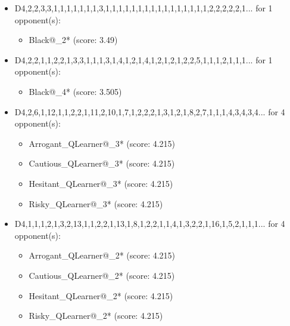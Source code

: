 \begin{appendices}
\begin{itemize}
    \item D4,2,2,3,3,1,1,1,1,1,1,1,3,1,1,1,1,1,1,1,1,1,1,1,1,1,1,1,1,2,2,2,2,2,1... for 1 opponent(s):
    \begin{multicols}{3}
         \begin{itemize}
            \item Black@\_2* (score: 3.49)
        \end{itemize}
     \end{multicols}
     
    \item D4,2,2,1,1,2,2,1,3,3,1,1,1,3,1,4,1,2,1,4,1,2,1,2,1,2,2,5,1,1,1,2,1,1,1... for 1 opponent(s):
    \begin{multicols}{3}
         \begin{itemize}
            \item Black@\_4* (score: 3.505)
        \end{itemize}
     \end{multicols}
     
    \item D4,2,6,1,12,1,1,2,2,1,11,2,10,1,7,1,2,2,2,1,3,1,2,1,8,2,7,1,1,1,4,3,4,3,4... for 4 opponent(s):
    \begin{multicols}{3}
         \begin{itemize}
            \item Arrogant\_QLearner@\_3* (score: 4.215)
            \item Cautious\_QLearner@\_3* (score: 4.215)
            \item Hesitant\_QLearner@\_3* (score: 4.215)
            \item Risky\_QLearner@\_3* (score: 4.215)
        \end{itemize}
     \end{multicols}
     
    \item D4,1,1,1,2,1,3,2,13,1,1,2,2,1,13,1,8,1,2,2,1,1,4,1,3,2,2,1,16,1,5,2,1,1,1... for 4 opponent(s):
    \begin{multicols}{3}
         \begin{itemize}
            \item Arrogant\_QLearner@\_2* (score: 4.215)
            \item Cautious\_QLearner@\_2* (score: 4.215)
            \item Hesitant\_QLearner@\_2* (score: 4.215)
            \item Risky\_QLearner@\_2* (score: 4.215)
        \end{itemize}
     \end{multicols}
     

\end{itemize}
\end{appendices}
